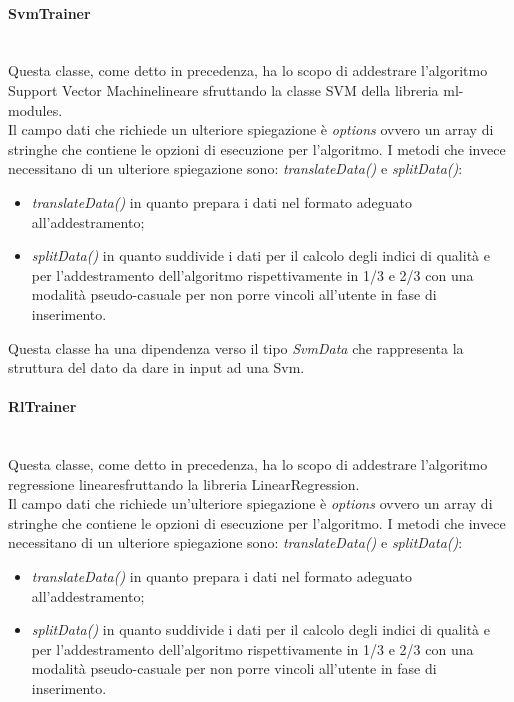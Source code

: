 		\paragraph*{SvmTrainer} \mbox{} \\[1mm]
		Questa classe, come detto in precedenza, ha lo scopo di addestrare l'algoritmo Support Vector Machine\glosp lineare sfruttando la classe SVM della libreria ml-modules. \\
		Il campo dati che richiede un ulteriore spiegazione è \textit{options} ovvero un array di stringhe che contiene le opzioni di esecuzione per l'algoritmo.
		I metodi che invece necessitano di un ulteriore spiegazione sono: \textit{translateData()} e \textit{splitData()}:\begin{itemize}
			\item \textit{translateData()} in quanto prepara i dati nel formato adeguato all'addestramento;
			\item \textit{splitData()} in quanto suddivide i dati per il calcolo degli indici di qualità e per l'addestramento dell'algoritmo rispettivamente in 1/3 e 2/3 con una modalità pseudo-casuale per non porre vincoli all'utente in fase di inserimento.
		\end{itemize}
		Questa classe ha una dipendenza verso il tipo \textit{SvmData} che rappresenta la struttura del dato da dare in input ad una Svm\glo.
		\paragraph*{RlTrainer} \mbox{} \\[1mm]
		Questa classe, come detto in precedenza, ha lo scopo di addestrare l'algoritmo regressione lineare\glosp sfruttando la libreria LinearRegression. \\
		Il campo dati che richiede un'ulteriore spiegazione è \textit{options} ovvero un array di stringhe che contiene le opzioni di esecuzione per l'algoritmo.
		I metodi che invece necessitano di un ulteriore spiegazione sono: \textit{translateData()} e \textit{splitData()}: 
		\begin{itemize}
			\item \textit{translateData()} in quanto prepara i dati nel formato adeguato all'addestramento;
			\item \textit{splitData()} in quanto suddivide i dati per il calcolo degli indici di qualità e per l'addestramento dell'algoritmo rispettivamente in 1/3 e 2/3 con una modalità pseudo-casuale per non porre vincoli all'utente in fase di inserimento.
		\end{itemize}

